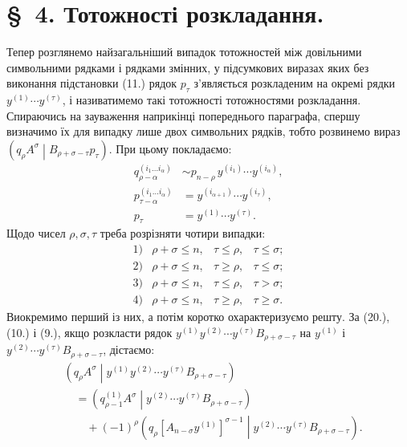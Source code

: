 \documentclass[11pt]{article}
\newcommand{\pair}[2]{\left(#1\middle|#2\right)}
\begin{document}
\section*{\S\ 4. Тотожності розкладання.}

Тепер розглянемо найзагальніший випадок тотожностей між довільними символьними рядками і рядками змінних, у підсумкових виразах яких без виконання підстановки (11.) рядок $p_\tau$ з'являється розкладеним на окремі рядки $y^{(1)}\cdots y^{(\tau)}$, і називатимемо такі тотожності тотожностями розкладання. Спираючись на зауваження наприкінці попереднього параграфа, спершу визначимо їх для випадку лише двох символьних рядків, тобто розвинемо вираз $\pair{q_\rho A^\sigma}{B_{\rho+\sigma-\tau}p_\tau}$. При цьому покладаємо:
\begin{equation}
\begin{aligned}
q_{\rho-\alpha}^{(i_1\ldots i_\alpha)}
&\sim p_{n-\rho}\,y^{(i_1)}\cdots y^{(i_\alpha)},\\
p_{\tau-\alpha}^{(i_1\ldots i_\alpha)}
&=y^{(i_{\alpha+1})}\cdots y^{(i_\tau)},\\
p_\tau&=y^{(1)}\cdots y^{(\tau)}.
\end{aligned}
\tag{22}
\end{equation}
Щодо чисел $\rho,\sigma,\tau$ треба розрізняти чотири випадки:
\[
\begin{array}{llll}
1)&\rho+\sigma\le n,& \tau\le\rho,& \tau\le\sigma;\\[2pt]
2)&\rho+\sigma\le n,& \tau\ge\rho,& \tau\le\sigma;\\[2pt]
3)&\rho+\sigma\le n,& \tau\le\rho,& \tau>\sigma;\\[2pt]
4)&\rho+\sigma\le n,& \tau\ge\rho,& \tau\ge\sigma.
\end{array}
\]
Виокремимо перший із них, а потім коротко охарактеризуємо решту. За (20.), (10.) і (9.), якщо розкласти рядок $y^{(1)}y^{(2)}\cdots y^{(\tau)}B_{\rho+\sigma-\tau}$ на $y^{(1)}$ і $y^{(2)}\cdots y^{(\tau)}B_{\rho+\sigma-\tau}$, дістаємо:
\begin{equation}
\begin{aligned}
&\pair{q_\rho A^\sigma}{y^{(1)}y^{(2)}\cdots y^{(\tau)}
B_{\rho+\sigma-\tau}}\\
&\quad=\pair{q_{\rho-1}^{(1)}A^\sigma}
{y^{(2)}\cdots y^{(\tau)}B_{\rho+\sigma-\tau}}\\
&\qquad+(-1)^\rho
\pair{q_\rho[A_{n-\sigma}y^{(1)}]^{\sigma-1}}
{y^{(2)}\cdots y^{(\tau)}B_{\rho+\sigma-\tau}}.
\end{aligned}
\tag{23}
\end{equation}
\end{document}
